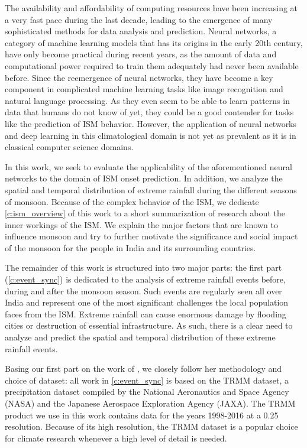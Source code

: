 The availability and affordability of computing resources have been increasing at a very fast pace during the last decade, leading to the emergence of many sophisticated methods for data analysis and prediction. Neural networks, a category of machine learning models that has its origins in the early 20th century, have only become practical during recent years, as the amount of data and computational power required to train them adequately had never been available before. Since the reemergence of neural networks, they have become a key component in complicated machine learning tasks like image recognition and natural language processing. As they even seem to be able to learn patterns in data that humans do not know of yet, they could be a good contender for tasks like the prediction of ISM behavior. However, the application of neural networks and deep learning in this climatological domain is not yet as prevalent as it is in classical computer science domains.

In this work, we seek to evaluate the applicability of the aforementioned neural networks to the domain of ISM onset prediction. In addition, we analyze the spatial and temporal distribution of extreme rainfall during the different seasons of monsoon. Because of the complex behavior of the ISM, we dedicate \cref{c:ism_overview} of this work to a short summarization of research about the inner workings of the ISM. We explain the major factors that are known to influence monsoon and try to further motivate the significance and social impact of the monsoon for the people in India and its surrounding countries.

The remainder of this work is structured into two major parts: the first part (\cref{c:event_sync}) is dedicated to the analysis of extreme rainfall events before, during and after the monsoon season. Such events are regularly seen all over India and represent one of the most significant challenges the local population faces from the ISM. Extreme rainfall can cause enormous damage by flooding cities or destruction of essential infrastructure. As such, there is a clear need to analyze and predict the spatial and temporal distribution of these extreme rainfall events.

Basing our first part on the work of \citet{Stolbova.2015}, we closely follow her methodology and choice of dataset: all work in \cref{c:event_sync} is based on the TRMM dataset, a precipitation dataset compiled by the National Aeronautics and Space Agency (NASA) and the Japanese Aerospace Exploration Agency (JAXA). The TRMM product we use in this work contains data for the years 1998-2016 at a {0.25\degree} resolution. Because of its high resolution, the TRMM dataset is a popular choice for climate research whenever a high level of detail is needed.

